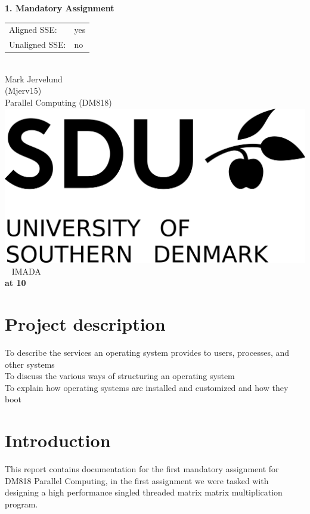 \documentclass[a4paper,10pt,titlepage]{report}
\date{}
\begin{document}
\begin{titlepage}
\centering
    \vspace*{9\baselineskip}
    \huge
    \bfseries
    1. Mandatory Assignment \\
    \begin{tabular}{ll}
    Aligned SSE: & yes \\
    Unaligned SSE: & no \\
\end{tabular} \\
    \normalfont 
    Mark Jervelund  \\
    (Mjerv15) \\
	\huge    
    Parallel Computing (DM818)  \\[4\baselineskip]
    \normalfont
	\includegraphics[scale=1]{SDU_Logo}
    \vfill\ 
    \vspace{5mm}
    IMADA \\

    \textbf{\datedate}  \bf{at 10} \\[2\baselineskip]
\end{titlepage}

\renewcommand{\thepage}{\roman{page}}%
\tableofcontents
\newpage
\setcounter{page}{1}
\renewcommand{\thepage}{\arabic{page}}
\section{Project description}
To describe the services an operating system provides to
users, processes, and other systems\\
To discuss the various ways of structuring an operating
system\\
To explain how operating systems are installed and
customized and how they boot\\
\newpage

\section{Introduction}
This report contains documentation for the first mandatory assignment for DM818 Parallel Computing, in the first assignment we were tasked with designing a high performance singled threaded matrix matrix multiplication program.
\end{document}
